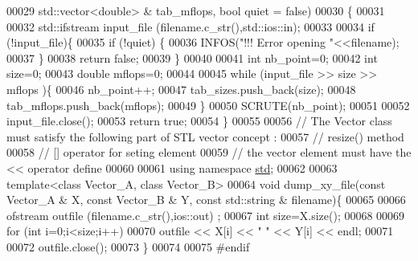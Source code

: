 \begin{DoxyCode}
00029                   std::vector<double> & tab\_mflops, \textcolor{keywordtype}{bool} quiet = \textcolor{keyword}{false})
00030 \{
00031 
00032   std::ifstream input\_file (filename.c\_str(),std::ios::in);
00033 
00034   \textcolor{keywordflow}{if} (!input\_file)\{
00035     \textcolor{keywordflow}{if} (!quiet) \{
00036       INFOS(\textcolor{stringliteral}{"!!! Error opening "}<<filename);
00037     \}
00038     \textcolor{keywordflow}{return} \textcolor{keyword}{false};
00039   \}
00040 
00041   \textcolor{keywordtype}{int} nb\_point=0;
00042   \textcolor{keywordtype}{int} size=0;
00043   \textcolor{keywordtype}{double} mflops=0;
00044 
00045   \textcolor{keywordflow}{while} (input\_file >> size >> mflops )\{
00046     nb\_point++;
00047     tab\_sizes.push\_back(size);
00048     tab\_mflops.push\_back(mflops);
00049   \}
00050   SCRUTE(nb\_point);
00051 
00052   input\_file.close();
00053   \textcolor{keywordflow}{return} \textcolor{keyword}{true};
00054 \}
00055 
00056 \textcolor{comment}{// The Vector class must satisfy the following part of STL vector concept :}
00057 \textcolor{comment}{//            resize() method}
00058 \textcolor{comment}{//            [] operator for seting element}
00059 \textcolor{comment}{// the vector element must have the << operator define}
00060 
00061 \textcolor{keyword}{using namespace }\hyperlink{namespacestd}{std};
00062 
00063 \textcolor{keyword}{template}<\textcolor{keyword}{class} Vector\_A, \textcolor{keyword}{class} Vector\_B>
00064 \textcolor{keywordtype}{void} dump\_xy\_file(\textcolor{keyword}{const} Vector\_A & X, \textcolor{keyword}{const} Vector\_B & Y, \textcolor{keyword}{const} std::string & filename)\{
00065   
00066   ofstream outfile (filename.c\_str(),ios::out) ;
00067   \textcolor{keywordtype}{int} size=X.size();
00068   
00069   \textcolor{keywordflow}{for} (\textcolor{keywordtype}{int} i=0;i<size;i++)
00070     outfile << X[i] << \textcolor{stringliteral}{" "} << Y[i] << endl;
00071 
00072   outfile.close();
00073 \} 
00074 
00075 \textcolor{preprocessor}{#endif}
\end{DoxyCode}
